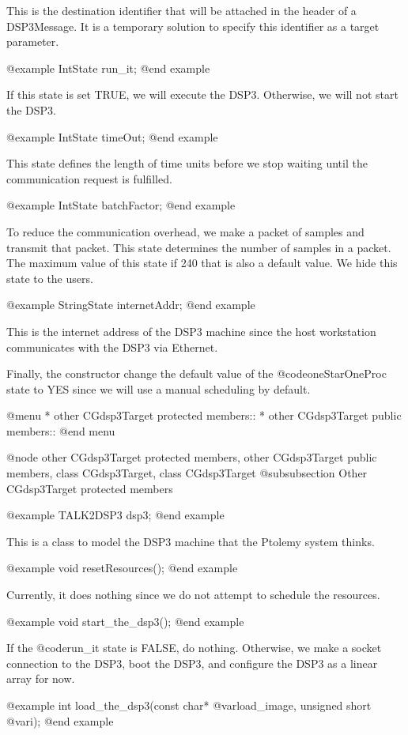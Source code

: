 {This is the destination identifier that will be attached in the header of
a DSP3Message. It is a temporary solution to specify this identifier as
a target parameter.

@example
IntState run_it;
@end example

If this state is set TRUE, we will execute the DSP3. Otherwise, we will not
start the DSP3.

@example
IntState timeOut;
@end example

This state defines the length of time units before we stop waiting
until the communication request is fulfilled.

@example
IntState batchFactor;
@end example

To reduce the communication overhead, we make a packet of samples
and transmit that packet. This state determines the number of samples
in a packet. The maximum value of this state if 240 that is also
a default value. We hide this state to the users.

@example
StringState internetAddr;
@end example

This is the internet address of the DSP3 machine since the host workstation
communicates with the DSP3 via Ethernet.

Finally, the constructor change the default value of the @code{oneStarOneProc}
state to YES since we will use a manual scheduling by default.

@menu
* other CGdsp3Target protected members::
* other CGdsp3Target public members::
@end menu

@node other CGdsp3Target protected members, other CGdsp3Target public members, class CGdsp3Target, class CGdsp3Target
@subsubsection Other CGdsp3Target protected members

@example
TALK2DSP3 dsp3;
@end example

This is a class to model the DSP3 machine that the Ptolemy system thinks.

@example
void resetResources();
@end example

Currently, it does nothing since we do not attempt to schedule the resources.

@example
void start_the_dsp3();
@end example

If the @code{run_it} state is FALSE, do nothing. Otherwise, we make a
socket connection to the DSP3, boot the DSP3, and configure the DSP3 as a
linear array for now.

@example
int load_the_dsp3(const char* @var{load_image}, unsigned short @var{i});
@end example

}
